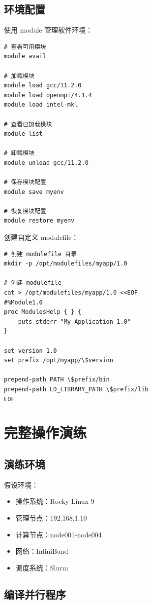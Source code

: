 \documentclass[12pt,UTF8]{ctexbook}
\begin{document}
\section{环境配置}
\label{sec:environment_configuration}

使用 module 管理软件环境：
\begin{verbatim}
# 查看可用模块
module avail

# 加载模块
module load gcc/11.2.0
module load openmpi/4.1.4
module load intel-mkl

# 查看已加载模块
module list

# 卸载模块
module unload gcc/11.2.0

# 保存模块配置
module save myenv

# 恢复模块配置
module restore myenv
\end{verbatim}

创建自定义 modulefile：
\begin{verbatim}
# 创建 modulefile 目录
mkdir -p /opt/modulefiles/myapp/1.0

# 创建 modulefile
cat > /opt/modulefiles/myapp/1.0 <<EOF
#%Module1.0
proc ModulesHelp { } {
    puts stderr "My Application 1.0"
}

set version 1.0
set prefix /opt/myapp/\$version

prepend-path PATH \$prefix/bin
prepend-path LD_LIBRARY_PATH \$prefix/lib
EOF
\end{verbatim}

\chapter{完整操作演练}
\label{chap:practice}

\section{演练环境}
\label{sec:practice_env}

假设环境：
\begin{itemize}
    \item 操作系统：Rocky Linux 9
    \item 管理节点：192.168.1.10
    \item 计算节点：node001-node004
    \item 网络：InfiniBand
    \item 调度系统：Slurm
\end{itemize}

\section{编译并行程序}
\label{sec:practice_compile}
\end{document}
